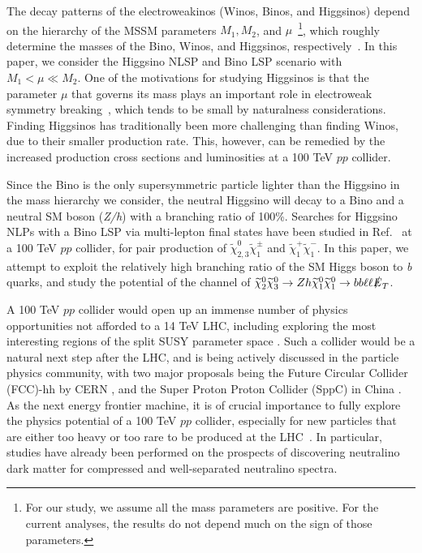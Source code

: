 \documentclass[a4paper,11pt]{article}
\newcommand{\N}{\widetilde{\chi}^0}
\newcommand{\C}{\widetilde{\chi}^\pm}
\newcommand{\met}{{\slashed{E}_T}}
\begin{document}
The decay patterns of the electroweakinos (Winos, Binos, and Higgsinos) depend
on the hierarchy of the MSSM parameters $M_1, M_2$, and $\mu$~\footnote{For our
study, we assume all the mass parameters are positive.  For the current
analyses, the results do not depend much on the sign of those parameters.},
which roughly determine the masses of the Bino, Winos, and Higgsinos,
respectively~\cite{Han:2013kza}.  In this paper, we consider the Higgsino NLSP
and Bino LSP scenario with $M_1 < \mu \ll M_2$.  One of the motivations for
studying Higgsinos is that the parameter $\mu$ that governs its mass plays an
important role in electroweak symmetry breaking~\cite{Acharya:2014pua}, which
tends to be small by naturalness considerations.   Finding Higgsinos has
traditionally been more challenging than finding Winos, due to their smaller
production rate. This, however, can be remedied by the increased  production
cross sections and luminosities at a 100 TeV $pp$ collider.


 

Since the Bino is the only supersymmetric particle lighter than the Higgsino in
the mass hierarchy we consider, the neutral Higgsino will decay to a Bino and a
neutral SM boson (\emph{Z/h}) with a branching ratio of 100\%.  Searches for
Higgsino NLPs with a Bino LSP  via  multi-lepton final states have been studied
in Ref.~\cite{Gori:2014oua} at a 100 TeV $pp$ collider, for pair production of
$\N_{2,3}\C_1$ and
$\widetilde\chi_{1}^+\widetilde\chi_1^-$. In this paper, we attempt to exploit
the relatively high branching ratio of the SM Higgs boson to \emph{b} quarks,
and study the potential of the channel of $\N_2\N_3\rightarrow Zh
\N_1\N_1\rightarrow bb\ell\ell \met$.

A 100 TeV $pp$ collider would open up an immense number of physics
opportunities not afforded to a 14 TeV LHC, including exploring the most
interesting regions of the split SUSY parameter space
\cite{Arkani-Hamed:2015vfh}.
Such a collider would be a natural next step after the LHC, and is being
actively discussed in the particle physics community, with two major proposals
being the Future Circular Collider (FCC)-hh by CERN \cite{FCC-hh}, and the
Super Proton Proton Collider (SppC)  in China \cite{CEPC}.  As the next energy
frontier machine, it is of crucial importance to fully explore the physics
potential of a 100 TeV $pp$ collider, especially for new particles that are
either too heavy or too rare to be produced at the
LHC~\cite{Arkani-Hamed:2015vfh,Contino:2016spe,Golling:2016gvc,Mangano:2016jyj}.
In particular, studies have already been performed on the prospects of
discovering neutralino dark matter for compressed \cite{Low:2014cba,
diCortona:2014yua,Cirelli:2014dsa,Mahbubani:2018tin,Han:2018wus} and
well-separated \cite{Gori:2014oua,Acharya:2014pua} neutralino spectra.
\end{document}
